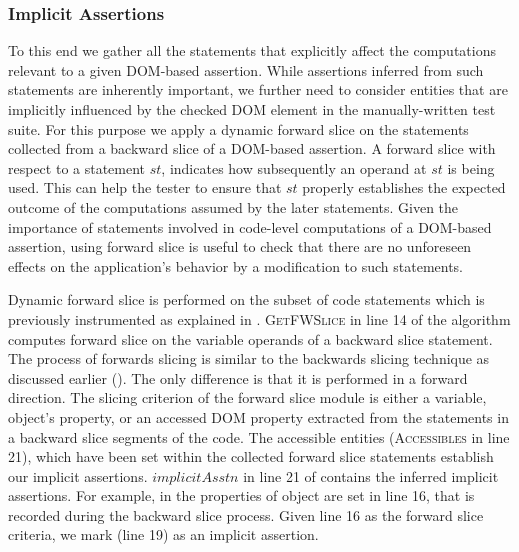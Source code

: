 \subsubsection{Implicit Assertions} \label{Sec:implicitAssertions}
To this end we gather all the statements that explicitly affect the computations relevant to a given DOM-based assertion. While assertions inferred from such statements are inherently important, we further need to consider entities that are implicitly influenced by the checked DOM element in the manually-written test suite. For this purpose we apply a dynamic forward slice on the statements collected from a backward slice of a DOM-based assertion. A forward slice with respect to a statement $st$,
indicates how subsequently an operand at $st$ is being used. This can help the tester to ensure that $st$ properly establishes the expected outcome of the computations assumed by the later statements. 
Given the importance of statements involved in code-level computations of a DOM-based assertion, using forward slice is useful to check that there are no unforeseen effects on the application's behavior by a modification to such statements. 

Dynamic forward slice is performed on the subset of code statements which is previously instrumented as explained in . 
\textsc{GetFWSlice} in line 14 of the algorithm computes forward slice on the variable operands of a backward slice statement.
The process of forwards slicing is similar to the backwards slicing technique as discussed earlier (). The only difference is that it is performed in a forward direction. The slicing criterion of the forward slice module is either a variable, object's property, or an accessed DOM property extracted from the statements in a backward slice segments of the code. The accessible entities (\textsc{Accessibles} in line 21), which have been set within the collected forward slice statements establish our implicit assertions.
$implicitAsstn$ in line 21 of  contains the inferred implicit assertions.
For example, in  the properties of object  are set in line 16, that is recorded during the backward slice process. Given line 16 as the forward slice criteria, we mark  (line 19) as an implicit assertion.        